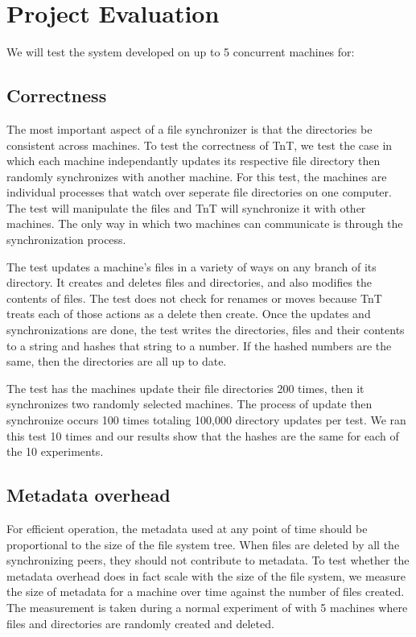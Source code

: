 \section{Project Evaluation}

We will test the system developed on up to 5 concurrent machines for:

\subsection{\bf Correctness} The most important aspect of a file synchronizer is that the directories be consistent across machines.  To test the correctness of TnT, we test the case in which each machine independantly updates its respective file directory then randomly synchronizes with another machine.  For this test, the machines are individual processes that watch over seperate file directories on one computer.  The test will manipulate the files and TnT will synchronize it with other machines.  The only way in which two machines can communicate is through the synchronization process.

The test updates a machine's files in a variety of ways on any branch of its directory.  It creates and deletes files and directories, and also modifies the contents of files.  The test does not check for renames or moves because TnT treats each of those actions as a delete then create.  Once the updates and synchronizations are done, the test writes the directories, files and their contents to a string and hashes that string to a number.  If the hashed numbers are the same, then the directories are all up to date.

The test has the machines update their file directories 200 times, then it synchronizes two randomly selected machines.  The process of update then synchronize occurs 100 times totaling 100,000 directory updates per test.  We ran this test 10 times and our results show that the hashes are the same for each of the 10 experiments.



\subsection{\bf Metadata overhead} For efficient operation, the metadata used at any point of time should be proportional to the size of the file system tree. When files are deleted by all the synchronizing peers, they should not contribute to metadata.  To test whether the metadata overhead does in fact scale with the size of the file system, we measure the size of metadata for a machine over time against the number of files created.  The measurement is taken during a normal experiment of with 5 machines where files and directories are randomly created and deleted.  

